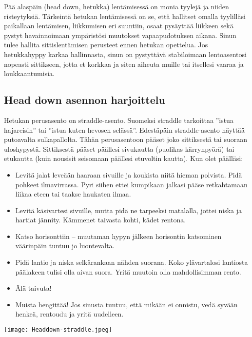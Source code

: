 Pää alaspäin (head down, hetukka) lentämisessä on monia tyylejä ja niiden risteytyksiä. Tärkeintä hetukan lentämisessä on se, että hallitset omalla tyylilläsi paikallaan lentämisen, liikkumisen eri suuntiin, osaat pysäyttää liikkeen sekä pystyt havainnoimaan ympäristösi muutokset vapaapudotuksen aikana. Sinun tulee hallita sittislentämisen perusteet ennen hetukan opettelua. Jos hetukkahyppy karkaa hallinnasta, sinun on pystyttävä stabiloimaan lentoasentosi nopeasti sittikseen, jotta et korkkaa ja siten aiheuta muille tai itsellesi vaaraa ja loukkaantumisia. 

\subsection{ Head down asennon harjoittelu }
\label{freefly-lentoasennot-head-down-asennon-harjoittelu}


Hetukan perusasento on straddle-asento. Suomeksi straddle tarkoittaa ”istua hajareisin” tai ”istua kuten hevosen selässä”. Edestäpäin straddle-asento näyttää putoavalta sulkapallolta. Tähän perusasentoon pääset joko sittiksestä tai suoraan uloshypystä. Sittiksestä pääset päällesi sivukautta (puolikas kärrynpyörä) tai etukautta (kuin nousisit seisomaan päällesi etuvoltin kautta). Kun olet päälläsi: 

\begin{itemize}
\item  Levitä jalat leveään haaraan sivuille ja koukista niitä hieman polvista. Pidä pohkeet ilmavirrassa. Pyri siihen ettei kumpikaan jalkasi pääse retkahtamaan liikaa eteen tai taakse haukaten ilmaa. 
\item  Levitä käsivartesi sivuille, mutta pidä ne tarpeeksi matalalla, jottei niska ja hartiat jännity. Kämmenet taivasta kohti, kädet rentona. 
\item  Katso horisonttiin – muutaman hypyn jälkeen horisontin katsominen väärinpäin tuntuu jo luontevalta. 
\item  Pidä lantio ja niska selkärankaan nähden suorana. Koko ylävartalosi lantiosta päälakeen tulisi olla aivan suora. Yritä muutoin olla mahdollisimman rento. 
\item  Älä taivuta! 
\item  Muista hengittää! Jos sinusta tuntuu, että mikään ei onnistu, vedä syvään henkeä, rentoudu ja yritä uudelleen. 
\end{itemize}

\begin{Figure}\centering\texttt{[image: Headdown-straddle.jpeg]}\end{Figure} 


